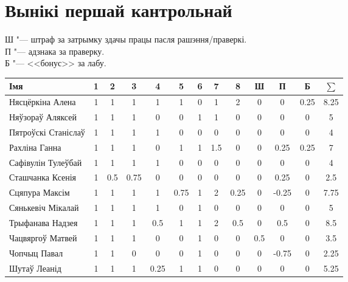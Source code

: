 


	\section{Вынікі першай кантрольнай}
	\noindent Ш "--- штраф за затрымку здачы працы пасля рашэння/праверкі. \\
	П "--- адзнака за праверку. \\
	Б "--- <<бонус>> за лабу.
\begin{table}[H]
	\begin{tabular}{|l|c|c|c|c|c|c|c|c|c|c|c|c|}
		\hline
		Імя                 & 1 & 2   & 3   & 4    & 5    & 6 & 7   & 8    & Ш   & П    & Б    & $\sum$ \\ \hline
		Нясцёркіна Алена    & 1 & 1   & 1   & 1    & 1    & 0 & 1   & 2    & 0   & 0    & 0.25 & 8.25                \\ \hline
		Няўзораў Аляксей    & 1 & 1   & 1   & 0    & 0    & 1 & 1   & 0    & 0   & 0    & 0    & 5                   \\ \hline
		Пятроўскі Станіслаў & 1 & 1   & 1   & 1    & 0    & 0 & 0   & 0    & 0   & 0    & 0    & 4                   \\ \hline
		Рахліна Ганна       & 1 & 1   & 1   & 0    & 1    & 1 & 1.5 & 0    & 0   & 0.25 & 0.25 & 7                   \\ \hline
		Сафівулін Тулеўбай  & 1 & 1   & 1   & 1    & 0    & 0 & 0   & 0    & 0   & 0    & 0    & 4                   \\ \hline
		Сташчанка Ксенія    & 1 & 0.5 & 0.75 & 0    & 0    & 0 & 0   & 0    & 0   & 0.25 & 0    & 2.5                \\ \hline
		Сцяпура Максім      & 1 & 1   & 1   & 1    & 0.75 & 1 & 2   & 0.25 & 0   & -0.25 & 0    & 7.75                 \\ \hline
		Сянькевіч Мікалай   & 1 & 1   & 1   & 1    & 0    & 1 & 0   & 0    & 0   & 0    & 0    & 5                   \\ \hline
		Трыфанава Надзея    & 1 & 1   & 1   & 0.5  & 1    & 1 & 2   & 0.5  & 0   & 0.5  & 0    & 8.5                 \\ \hline
		Чацвяргоў Матвей    & 1 & 1   & 1   & 0    & 0    & 1 & 0   & 0    & 0.5 & 0    & 0    & 3.5                 \\ \hline
		Чопчыц Павал        & 1 & 1   & 0   & 0    & 0    & 1 & 0   & 0    & 0   & -0.75   & 0    & 2.25                   \\ \hline
		Шутаў Леанід        & 1 & 1   & 1   & 0.25 & 1    & 1 & 0   & 0    & 0   & 0    & 0    & 5.25                \\ \hline
	\end{tabular}
\end{table}
	
